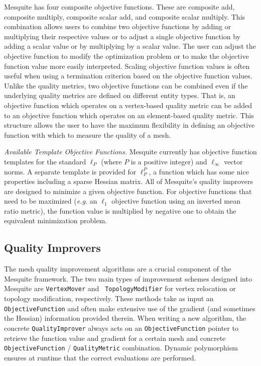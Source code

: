 \documentclass[psfig]{article}
\begin{document}
Mesquite has four composite objective functions.  These are
composite add, composite multiply, composite scalar add, and
composite scalar multiply.  This combination allows users
to combine two objective functions by adding or multiplying
their respective values or to adjust a single objective function
by adding a scalar value or by multiplying by a scalar value.  
The user can adjust the objective function to modify the
optimization problem or to make the objective function value
more easily interpreted.  Scaling objective function values
is often useful when using a termination criterion based on the
objective function values. Unlike the quality metrics, 
two objective functions can be combined
even if the underlying quality metrics are defined on different entity
types.  That is, an objective function which operates on a vertex-based
quality metric can be added to an objective function which operates
on an element-based quality metric.  This structure allows the user
to have the maximum flexibility in defining an objective function with
which to measure the quality of a mesh.


{\it Available Template Objective Functions.}  Mesquite currently has objective
function templates for the standard $\ell_{P}$ (where $P$ is a
positive integer) and $\ell_{\infty}$ vector norms.  A separate
template is provided for $\ell_{P}^{P}$, a function which has some
nice properties including a sparse Hessian matrix.  All of Mesquite's
quality improvers are designed to minimize a given objective function.
For objective functions that need to be maximized ({\it e.g.} an
$\ell_{1}$ objective function using an inverted mean ratio metric),
the function value is multiplied by negative one to obtain the
equivalent minimization problem.

\subsection{Quality Improvers}

The mesh quality improvement algorithms are a crucial component of the
Mesquite framework.  The two main types of improvement schemes
designed into Mesquite are {\tt VertexMover} and {\tt
TopologyModifier} for vertex relocation or topology modification,
respectively.  These methods take as input an {\tt ObjectiveFunction}
and often make extensive use of the gradient (and sometimes the
Hessian) information provided therein.  When writing a new algorithm,
the concrete \texttt{QualityImprover} always acts on an
\texttt{ObjectiveFunction} pointer to retrieve the function value and
gradient for a certain mesh and concrete \texttt{ObjectiveFunction} /
\texttt{QualityMetric} combination.  Dynamic polymorphism ensures at
runtime that the correct evaluations are performed.
\end{document}
